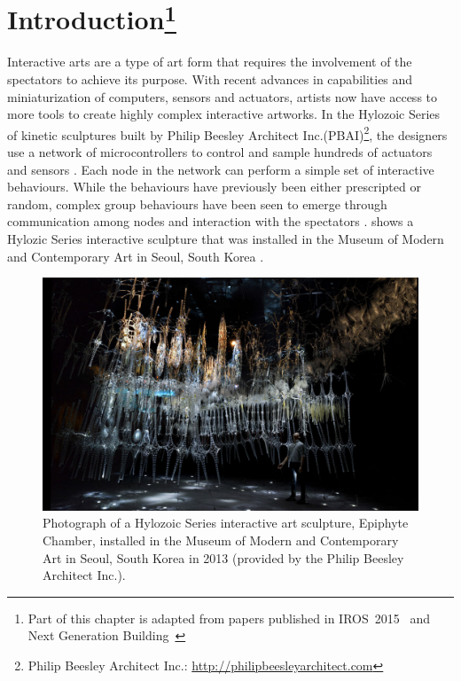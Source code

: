 \chapter[Introduction]{Introduction\footnote{Part of this chapter is adapted from papers published in IROS~2015~\cite{Chan2015} and Next Generation \mbox{Building}~\cite{Gorbet2015}}} 
\label{chap:intro}

Interactive arts are a type of art form that requires the involvement of the spectators to achieve its purpose. With recent advances in capabilities and miniaturization of computers, sensors and actuators, artists now have access to more tools to create highly complex interactive artworks. In the Hylozoic Series of kinetic sculptures built by Philip Beesley Architect Inc.(PBAI)\footnote{Philip Beesley Architect Inc.: \url{http://philipbeesleyarchitect.com}}, the designers use a network of microcontrollers to control and sample hundreds of actuators and sensors \cite{Beesley2010}\cite{Beesley2010-1}. Each node in the network can perform a simple set of interactive behaviours. While the behaviours have previously been either prescripted or random, complex group behaviours have been seen to emerge through communication among nodes and interaction with the spectators \cite{Beesley2012}.  shows a Hylozic Series interactive sculpture that was installed in the Museum of Modern and Contemporary Art in Seoul, South Korea \cite{PBAISeoul2013}. 

\begin{figure} [!htb]
	\centering
	\includegraphics[width=1.0 \textwidth]{"fig/introduction/PBAI_09"}
	\caption[Photograph of a Hylozoic Series interactive art sculpture, Epiphyte Chamber]{Photograph of a Hylozoic Series interactive art sculpture, Epiphyte Chamber, installed in the Museum of Modern and Contemporary Art in Seoul, South Korea in 2013 (provided by the Philip Beesley Architect Inc.).}
	\label{fig:other-sculpture-photo}
\end{figure}

